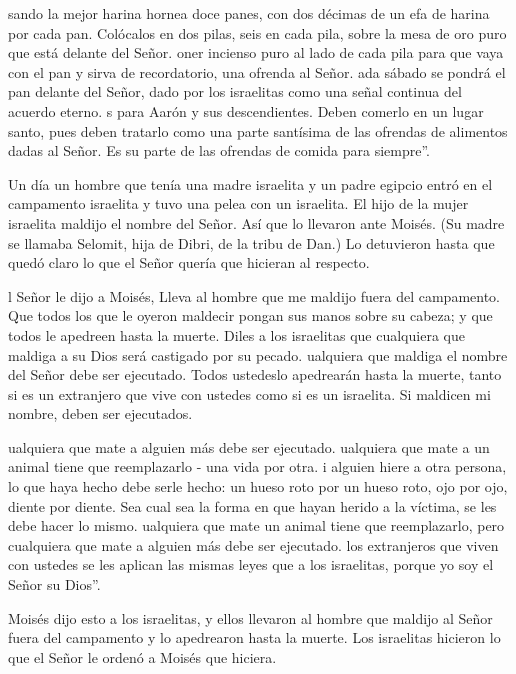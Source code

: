  sando la mejor harina hornea doce panes, con dos décimas de
un efa de harina por cada pan.  Colócalos en dos pilas, seis
en cada pila, sobre la mesa de oro puro que está delante del Señor.
 oner incienso puro al lado de cada pila para que vaya con
el pan y sirva de recordatorio, una ofrenda al Señor.  ada
sábado se pondrá el pan delante del Señor, dado por los israelitas como
una señal continua del acuerdo eterno.  s para Aarón y sus
descendientes. Deben comerlo en un lugar santo, pues deben tratarlo como
una parte santísima de las ofrendas de alimentos dadas al Señor. Es su
parte de las ofrendas de comida para siempre''.

 Un día un hombre que tenía una madre israelita y un padre
egipcio entró en el campamento israelita y tuvo una pelea con un
israelita.  El hijo de la mujer israelita maldijo el nombre
del Señor. Así que lo llevaron ante Moisés. (Su madre se llamaba
Selomit, hija de Dibri, de la tribu de Dan.)  Lo detuvieron
hasta que quedó claro lo que el Señor quería que hicieran al respecto.

 l Señor le dijo a Moisés,  Lleva al hombre
que me maldijo fuera del campamento. Que todos los que le oyeron
maldecir pongan sus manos sobre su cabeza; y que todos le apedreen hasta
la muerte.  Diles a los israelitas que cualquiera que
maldiga a su Dios será castigado por su pecado.  ualquiera
que maldiga el nombre del Señor debe ser ejecutado. Todos ustedeslo
apedrearán hasta la muerte, tanto si es un extranjero que vive con
ustedes como si es un israelita. Si maldicen mi nombre, deben ser
ejecutados.

 ualquiera que mate a alguien más debe ser ejecutado.
 ualquiera que mate a un animal tiene que reemplazarlo -
una vida por otra.  i alguien hiere a otra persona, lo que
haya hecho debe serle hecho:  un hueso roto por un hueso
roto, ojo por ojo, diente por diente. Sea cual sea la forma en que hayan
herido a la víctima, se les debe hacer lo mismo.  ualquiera
que mate un animal tiene que reemplazarlo, pero cualquiera que mate a
alguien más debe ser ejecutado.  los extranjeros que viven
con ustedes se les aplican las mismas leyes que a los israelitas, porque
yo soy el Señor su Dios''.

 Moisés dijo esto a los israelitas, y ellos llevaron al
hombre que maldijo al Señor fuera del campamento y lo apedrearon hasta
la muerte. Los israelitas hicieron lo que el Señor le ordenó a Moisés
que hiciera.

